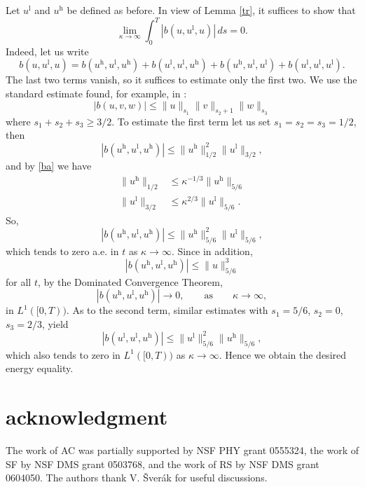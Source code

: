 \documentclass[12pt]{amsart}
\theoremstyle{plain}
\theoremstyle{definition}
\theoremstyle{remark}
\begin{document}
Let ${{u^\mathrm{l}}}$ and ${{u^\mathrm{h}}}$ be defined as before.
In view of Lemma \ref{tr}, it suffices to show that
\begin{equation}
\lim_{{\kappa} \to \infty} \int_0^T |b(u,{{u^\mathrm{l}}},u)| \, ds = 0.
\end{equation}
Indeed, let us write
$$
b(u,{{u^\mathrm{l}}},u) = b({{u^\mathrm{h}}},{{u^\mathrm{l}}},{{u^\mathrm{h}}}) + b({{u^\mathrm{l}}},{{u^\mathrm{l}}},{{u^\mathrm{h}}}) +
b({{u^\mathrm{h}}},{{u^\mathrm{l}}},{{u^\mathrm{l}}})+b({{u^\mathrm{l}}},{{u^\mathrm{l}}},{{u^\mathrm{l}}}).
$$
The last two terms vanish, so it suffices to estimate only the first
two. We use the standard estimate found, for example, in \cite{CF}:
\begin{equation}\label{}
    |b(u,v,w)| \leq \|u\|_{s_1} \| v\|_{s_2+1} \|w\|_{s_3}
\end{equation}
where $s_1+s_2+s_3 \geq 3/2$. To estimate the first term let us set
$s_1 = s_2 = s_3 = 1/2$, then
$$
|b({{u^\mathrm{h}}},{{u^\mathrm{l}}},{{u^\mathrm{h}}})| \leq \|{{u^\mathrm{h}}}\|^2_{1/2} \|{{u^\mathrm{l}}}\|_{3/2},
$$
and by \eqref{ba} we have
\begin{align}
\|{{u^\mathrm{h}}}\|_{1/2} &\leq  {\kappa}^{-1/3}\|{{u^\mathrm{h}}}\|_{5/6} \\
\|{{u^\mathrm{l}}}\|_{3/2} & \leq  {\kappa}^{2/3} \|{{u^\mathrm{l}}}\|_{5/6}.
\end{align}
So,
$$
|b({{u^\mathrm{h}}},{{u^\mathrm{l}}},{{u^\mathrm{h}}})| \leq  \|{{u^\mathrm{h}}}\|_{5/6}^2\|{{u^\mathrm{l}}}\|_{5/6},
$$
which tends to zero a.e. in $t$ as ${\kappa} {\rightarrow} \infty$. Since in
addition,
$$
|b({{u^\mathrm{h}}},{{u^\mathrm{l}}},{{u^\mathrm{h}}})| \leq  \|u\|^3_{5/6}
$$
for all $t$, by the Dominated Convergence Theorem,
$$
|b({{u^\mathrm{h}}},{{u^\mathrm{l}}},{{u^\mathrm{h}}})| \to 0, \qquad \text{as} \qquad {\kappa} \to \infty,
$$
in $L^1([0,T))$. As to the second term, similar estimates with $s_1
= 5/6$, $s_2 = 0$, $s_3 = 2/3$, yield
$$
|b({{u^\mathrm{l}}},{{u^\mathrm{l}}},{{u^\mathrm{h}}})| \leq  \|{{u^\mathrm{l}}}\|^2_{5/6}\|{{u^\mathrm{h}}}\|_{5/6},
$$
which also tends to zero in $L^1([0,T))$ as ${\kappa} {\rightarrow} \infty$. Hence
we obtain the desired energy equality.

\section*{acknowledgment}
The work of AC was partially supported by NSF PHY grant 0555324, the
work of SF by NSF DMS grant 0503768, and the work of RS by NSF DMS
grant 0604050. The authors thank V. \v{S}ver\'{a}k for useful
discussions.
\end{document}
